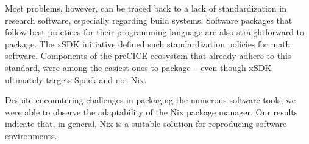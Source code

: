 \documentclass{eceasst}
\begin{document}
Most problems, however, can be traced back to a lack of standardization in research software, especially regarding build systems.
Software packages that follow best practices for their programming language are also straightforward to package.
The xSDK initiative defined such standardization policies for math software. Components of the preCICE ecosystem that already adhere to this standard, were among the easiest ones to package -- even though xSDK ultimately targets Spack and not Nix.

Despite encountering challenges in packaging the numerous software tools, we were able to observe the adaptability of the Nix package manager.
Our results indicate that, in general, Nix is a suitable solution for reproducing software environments.





\end{document}
